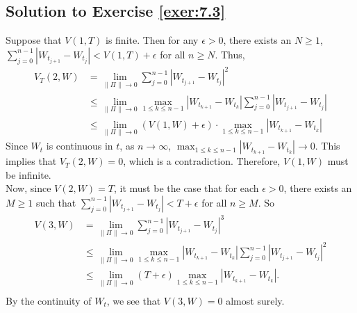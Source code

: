 \documentclass[12pt]{book}
\numberwithin{equation}{chapter}
\theoremstyle{plain}
\numberwithin{theorem}{section}
\theoremstyle{definition}
\numberwithin{exercise}{chapter}
\newcommand{\<}{\langle}
\renewcommand{\>}{\rangle}
\renewcommand{\(}{\left(}
\renewcommand{\)}{\right)}
\renewcommand{\[}{\left[}
\renewcommand{\]}{\right]}
\begin{document}
\subsection*{Solution to Exercise \ref{exer:7.3}}
Suppose that $V(1,T)$ is finite. Then for any $\epsilon > 0$, there exists an $N \geq 1$, $\sum_{j=0}^{n-1} | 
W_{t_{j+1}} - W_{t_j}| < V(1,T) + \epsilon$ for all $n \geq N$. Thus, 
\begin{align}
V_T(2,W)
	&= \lim_{\| \Pi\| \to 0} \sum_{j=0}^{n-1} | W_{t_{j+1}} - W_{t_j}|^2 \\
	&\leq \lim_{\| \Pi\| \to 0}  
	\max_{1\leq k \leq n-1} |W_{t_{k+1}} - W_{t_{k}}| 
	\sum_{j=0}^{n-1} |W_{t_{j+1}} - W_{t_j}| \\
	&\leq \lim_{\| \Pi\| \to 0}  ( V(1,W) + \epsilon) \cdot 
	\max_{1\leq k \leq n-1} |W_{t_{k+1}} - W_{t_{k}}| 
\end{align}
Since $W_t$ is continuous in $t$, as $n\to \infty$, $\max_{1\leq k \leq n-1} |W_{t_{k+1}} - W_{t_{k}}| \to 0$. This 
implies that $V_T(2,W) = 0$, which is a contradiction. Therefore, $V(1,W)$ must be infinite. 
\\[0.5em]
Now, since $V(2,W) = T$, it must be the case that for each $\epsilon > 0$, there exists an $M \geq 1$ such that 
$\sum_{j=0}^{n-1} | W_{t_{j+1}} - W_{t_j}| < T + \epsilon$ for all $n \geq M$. So
\begin{align}
V(3,W)
	&= \lim_{\| \Pi\| \to 0} \sum_{j=0}^{n-1} | W_{t_{j+1}} - W_{t_j}|^3 \\
	&\leq \lim_{\| \Pi\| \to 0}  
	\max_{1\leq k \leq n-1} |W_{t_{k+1}} - W_{t_{k}}| 
	\sum_{j=0}^{n-1} |W_{t_{j+1}} - W_{t_j}|^2 \\
	&\leq  \lim_{\| \Pi\| \to 0} (T + \epsilon) \max_{1\leq k \leq n-1} |W_{t_{k+1}} - W_{t_{k}}|. \\
\end{align}
By the continuity of $W_t$, we see that $V(3,W) = 0$ almost surely. 
\end{document}
